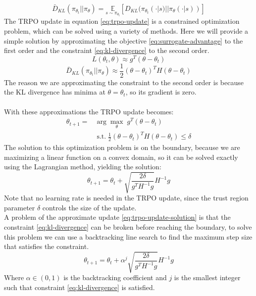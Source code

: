 \begin{equation}
    \bar D_{KL}(\pi_{\theta_t} || \pi_{\theta}) = \underset{s \sim \pi_{\theta_t}}{\mathbb{E}} \left[ D_{KL}(\pi_{\theta_t}(\cdot|s) || \pi_{\theta}(\cdot|s)) \right]
    \label{eq:kl-divergence}
\end{equation}
The TRPO update in equation \eqref{eq:trpo-update} is a constrained optimization problem, which can be solved using a variety of methods. Here we will provide a simple solution by approximating the objective \eqref{eq:surrogate-advantage} to the first order and the constraint \eqref{eq:kl-divergence} to the second order.\\
\begin{equation}
    L(\theta_t, \theta) \approx g^T (\theta - \theta_t)
\end{equation}
\begin{equation}
    \bar D_{KL}(\pi_{\theta_t} || \pi_{\theta}) \approx \frac{1}{2} (\theta - \theta_t)^T H (\theta - \theta_t)
\end{equation}
The reason we are approximating the constraint to the second order is because the KL divergence has minima at $\theta = \theta_t$, so its gradient is zero.\\\\
With these approximations the TRPO update becomes:
\begin{equation}
    \begin{split}
        \theta_{t+1} = & \arg\max_{\theta} \; g^T (\theta - \theta_t)\\
        & \; \text{s.t.} \; \frac{1}{2} (\theta - \theta_t)^T H (\theta - \theta_t) \leq \delta        
    \end{split}
    \label{eq:trpo-update-approx}
\end{equation}
The solution to this optimization problem is on the boundary, because we are maximizing a linear function on a convex domain, so it can be solved exactly using the Lagrangian method, yielding the solution:
\begin{equation}
    \theta_{t+1} = \theta_t + \sqrt{\frac{2\delta}{g^T H^{-1} g}} H^{-1} g
    \label{eq:trpo-update-solution}
\end{equation}
Note that no learning rate is needed in the TRPO update, since the trust region parameter $\delta$ controls the size of the update.\\
A problem of the approximate update \eqref{eq:trpo-update-solution} is that the constraint \eqref{eq:kl-divergence} can be broken before reaching the boundary, to solve this problem we can use a backtracking line search to find the maximum step size that satisfies the constraint.\\
\begin{equation}
    \theta_{t+1} = \theta_t + \alpha^j \sqrt{\frac{2\delta}{g^T H^{-1} g}} H^{-1} g
    \label{eq:trpo-update-line-search}
\end{equation}
Where $\alpha \in (0, 1)$ is the backtracking coefficient and $j$ is the smallest integer such that constraint \eqref{eq:kl-divergence} is satisfied.\\

